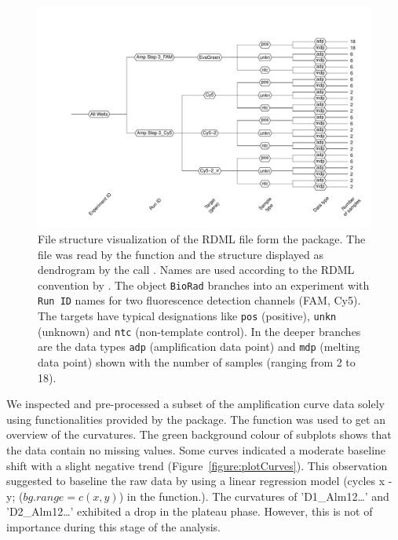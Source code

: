 \begin{figure}[htbp]
  \centering
  \includegraphics[clip=true,trim=4cm 1cm 0.9cm 2.75cm, width=12cm]{figures/RDML_dendrogram.pdf}
  \caption{File structure visualization of the RDML file 
 form the  package. The file was read 
by the  function and the structure displayed as dendrogram by the 
call . Names are used according to the RDML 
convention by \citet{lefever_2009}. The object \texttt{BioRad} branches into an 
experiment with \texttt{Run ID} names for two fluorescence detection channels 
(FAM, Cy5). The targets have typical designations like \texttt{pos} (positive), 
\texttt{unkn} (unknown) and \texttt{ntc} (non-template control). In the deeper 
branches are the data types \texttt{adp} (amplification data point) and 
\texttt{mdp} (melting data point) shown with the number of samples (ranging from 
2 to 18).
} 
\label{figure:RDML_dendrogram}
\end{figure}

We inspected and pre-processed a subset of the amplification curve data solely 
using functionalities provided by the  package. The 
 function was used to get an overview of the curvatures. The 
green background colour of subplots shows that the data contain no missing 
values. Some curves indicated a moderate baseline shift with a slight negative 
trend (Figure~\ref{figure:plotCurves}). This observation suggested to baseline 
the raw data by using a linear regression model (cycles x - y; ($bg.range = c(x, 
y)$) in the  function.). The curvatures of 'D1\_Alm12\ldots' and 
'D2\_Alm12\ldots' exhibited a drop in the plateau phase. However, this is not of 
importance during this stage of the analysis.

